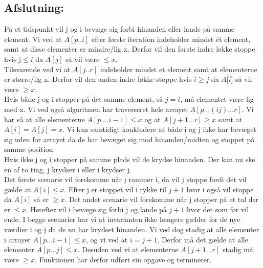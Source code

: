 \documentclass[10pt,a4paper,danish]{article}
\begin{document}
\subsection{Afslutning:}
\label{sec:afsl-it}
På et tidspunkt vil j og i bevæge sig forbi hinanden eller lande på samme element. 
Vi ved at $A[p..i]$ efter første iteration indeholder mindst ét element, samt at disse elementer er mindre/lig x. Derfor vil den første indre løkke stoppe hvis j$ \leq i$ da $A[j]$ så vil være $\leq x$. 
\\

Tilsvarende ved vi at $A[j..r]$ indeholder mindst et element samt at elementerne er større/lig x. Derfor vil den anden indre løkke stoppe hvis $i \geq j$ da $A[i$] så vil være $\geq x$. 
\\

Hvis bãde j og i stopper på det samme element, så $j=i$, må elementet være lig med x. Vi ved også algoritmen har traverseret hele arrayet $A[p \ldots(ij) \ldots r]$. Vi har så at alle elementerne $A[p.\ldots i-1] \leq x$ og at $A[j+1\ldots r] \geq x$ samt at $A[i]=A[j]=x$.
Vi kan samtidigt konkludere at både i og j ikke har bevæget sig uden for arrayet da de har bevæget sig mod hinanden/midten og stoppet på samme position.
\\

Hvis ikke j og i stopper på samme plads vil de krydse hinanden.
Der kan nu ske en af to ting, j krydser i eller i krydser j.
\\

Det første scenarie vil forekomme når j rammer i, da vil j stoppe fordi det vil gælde at $A[i] \leq x$. Efter j er stoppet vil i rykke til $j+1$ hvor i også vil stoppe da $A[i]$ så er $\geq x$.
Det andet scenarie vil forekomme når j stopper på et tal der er $\leq x$. Herefter vil i bevæge sig forbi j og lande på $j+1$ hvor det som før vil ende.
I begge scenarier har vi at invarianten ikke længere gælder for de nye værdier i og j da de nu har krydset hinanden. Vi ved dog stadig at alle elementer i arrayet $A[p\ldots i-1] \leq x$, og vi ved at $i = j+1$. Derfor må det gælde at alle elementer $A[p\ldots j] \leq x$. Desuden ved vi at elementerne $A[j+1\ldots r]$ stadig må være $\geq x$. 
Funktionen har derfor udført sin opgave og terminerer. 
\\
\end{document}
